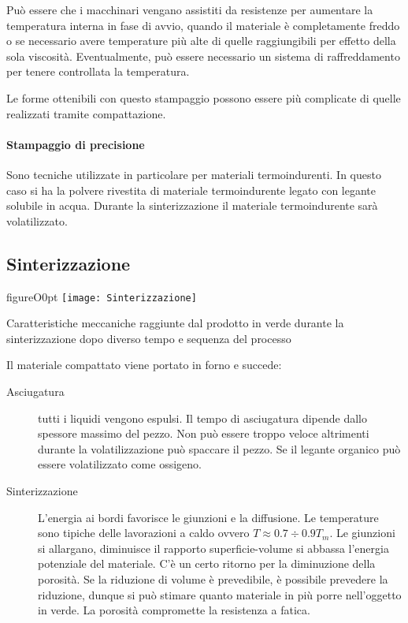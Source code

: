 Può essere che i macchinari vengano assistiti da resistenze per aumentare la temperatura interna in fase di avvio, quando il materiale è completamente freddo o se necessario avere temperature più alte di quelle raggiungibili per effetto della sola viscosità.
Eventualmente, può essere necessario un sistema di raffreddamento per tenere controllata la temperatura.

Le forme ottenibili con questo stampaggio possono essere più complicate di quelle realizzati tramite compattazione.

\paragraph{Stampaggio di precisione}
Sono tecniche utilizzate in particolare per materiali termoindurenti.
In questo caso si ha la polvere rivestita di materiale termoindurente legato con legante solubile in acqua. Durante la sinterizzazione il materiale termoindurente sarà volatilizzato.

\subsection{Sinterizzazione}
\begin{wrapfloat}{figure}{O}{0pt}
\texttt{[image: Sinterizzazione]}
\caption{Caratteristiche meccaniche raggiunte dal prodotto in verde durante la sinterizzazione dopo diverso tempo e sequenza del processo}
\label{fig:Sinterizzazione}
\end{wrapfloat}
Il materiale compattato viene portato in forno e succede:
\begin{description}
\item[Asciugatura] tutti i liquidi vengono espulsi. Il tempo di asciugatura dipende dallo spessore massimo del pezzo. Non può essere troppo veloce altrimenti durante la volatilizzazione può spaccare il pezzo. Se il legante organico può essere volatilizzato come ossigeno.
\item[Sinterizzazione] L'energia ai bordi favorisce le giunzioni e la diffusione. Le temperature sono tipiche delle lavorazioni a caldo ovvero $T \approx 0.7 \div 0.9 T_m$.
Le giunzioni si allargano, diminuisce il rapporto superficie-volume si abbassa l'energia potenziale del materiale. C'è un certo ritorno per la diminuzione della porosità. Se la riduzione di volume è prevedibile, è possibile prevedere la riduzione, dunque si può stimare quanto materiale in più porre nell'oggetto in verde. La porosità compromette la resistenza a fatica.
\end{description}


